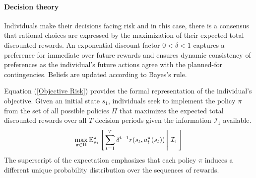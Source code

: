 \paragraph{Decision theory} Individuals make their decisions facing risk and in this case, there is a consensus that rational choices are expressed by the maximization of their expected total discounted rewards. An exponential discount factor $0 < \delta < 1$ captures a preference for immediate over future rewards and ensures dynamic consistency of preferences as the individual's future actions agree with the planned-for contingencies. Beliefs are updated according to Bayes's rule.

Equation (\ref{Objective Risk}) provides the formal representation of the individual's objective. Given an initial state $s_1$, individuals seek to implement the policy $\pi$ from the set of all possible policies $\Pi$ that maximizes the expected total discounted rewards over all $T$ decision periods given the information $\mathcal{I}_1$ available.
%
\begin{align}\label{Objective Risk}
\max_{\pi \in\Pi} \mathrm{E}_{s_1}^\pi\left[\left.\sum^{T}_{t = 1}  \delta^{t - 1} r(s_t, a^\pi_t(s_t))\,\right\vert\,\mathcal{I}_1\,\right]
\end{align}
%
The superscript of the expectation emphasizes that each policy $\pi$ induces a different unique probability distribution over the sequences of rewards.
